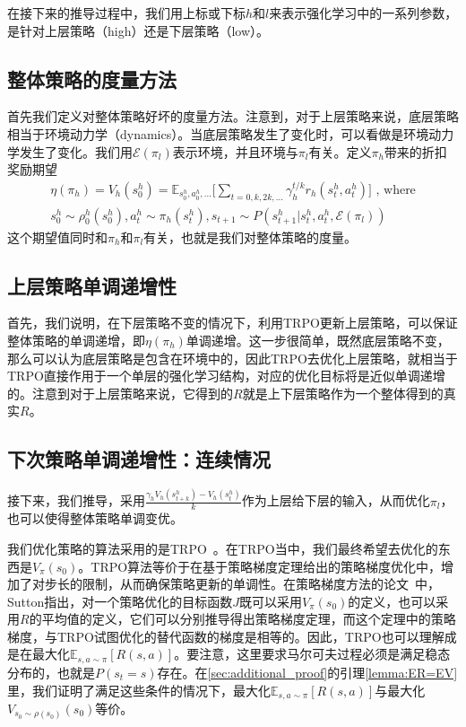 在接下来的推导过程中，我们用上标或下标$h$和$l$来表示强化学习中的一系列参数，是针对上层策略（high）还是下层策略（low）。

\subsection{整体策略的度量方法}
首先我们定义对整体策略好坏的度量方法。注意到，对于上层策略来说，底层策略相当于环境动力学（dynamics）。当底层策略发生了变化时，可以看做是环境动力学发生了变化。我们用$\mathcal{E}(\pi_l)$表示环境，并且环境与$\pi_l$有关。定义$\pi_h$带来的折扣奖励期望
\begin{equation}
\begin{aligned}
  \eta(\pi_h) = V_h(s_0^h) = \mathbb{E}_{s_0^h, a_0^h, ...}\Bigg[\sum_{t = 0, k, 2k, ...} \gamma_h^{t/k} r_h(s_t^h, a_t^h)\Bigg] \text{ ,  where}   \\
  s_0^h \sim \rho_0^h(s_0^h), a_t^h \sim \pi_h(s_t^h), s_{t+1} \sim P(s_{t+1}^h|s_t^h, a_t^h, \mathcal{E}(\pi_l))
\end{aligned}
\end{equation}
这个期望值同时和$\pi_h$和$\pi_l$有关，也就是我们对整体策略的度量。

\subsection{上层策略单调递增性}
首先，我们说明，在下层策略不变的情况下，利用TRPO更新上层策略，可以保证整体策略的单调递增，即$\eta(\pi_h)$单调递增。这一步很简单，既然底层策略不变，那么可以认为底层策略是包含在环境中的，因此TRPO去优化上层策略，就相当于TRPO直接作用于一个单层的强化学习结构，对应的优化目标将是近似单调递增的。注意到对于上层策略来说，它得到的$R$就是上下层策略作为一个整体得到的真实$R$。

\subsection{下次策略单调递增性：连续情况}
接下来，我们推导，采用$ \frac{\gamma_h V_h(s_{t + k}^h) - V_h(s_{t}^h)}{k}$作为上层给下层的输入，从而优化$\pi_l$，也可以使得整体策略单调变优。

我们优化策略的算法采用的是TRPO~\cite{TRPO}。在TRPO当中，我们最终希望去优化的东西是$V_{\pi}(s_0)$。TRPO算法等价于在基于策略梯度定理给出的策略梯度优化中，增加了对步长的限制，从而确保策略更新的单调性。在策略梯度方法的论文~\cite{policy_gradient_theorem}中，Sutton指出，对一个策略优化的目标函数$J$既可以采用$V_{\pi}(s_0)$的定义，也可以采用$R$的平均值的定义，它们可以分别推导得出策略梯度定理，而这个定理中的策略梯度，与TRPO试图优化的替代函数的梯度是相等的。因此，TRPO也可以理解成是在最大化$\mathbb{E}_{s, a \sim \pi}[R(s, a)]$。要注意，这里要求马尔可夫过程必须是满足稳态分布的，也就是$P(s_t = s)$存在。在\ref{sec:additional_proof}的引理\ref{lemma:ER=EV}里，我们证明了满足这些条件的情况下，最大化$\mathbb{E}_{s, a \sim \pi}[R(s, a)]$与最大化$V_{s_0 \sim \rho(s_0)}(s_0)$等价。

